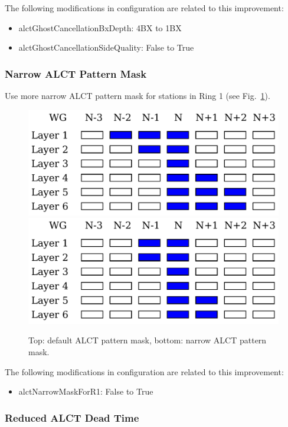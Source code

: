 The following modifications in configuration are related to this improvement:
\begin{itemize}
    \item alctGhostCancellationBxDepth: 4BX to 1BX
    \item alctGhostCancellationSideQuality: False to True
\end{itemize}

\subsubsection{Narrow ALCT Pattern Mask}

Use more narrow ALCT pattern mask for stations in Ring 1 (see Fig.~\ref{fig:narrow_alct_pattern_mask}).

\begin{figure}[tbh]
        \begin{center}
                \includegraphics[width=0.49\linewidth]{figures/alct_pretrigger.pdf}\\
                \includegraphics[width=0.49\linewidth]{figures/alct_pretrigger_r1.pdf}
                \caption{Top: default ALCT pattern mask, bottom: narrow ALCT pattern mask.}
                \label{fig:narrow_alct_pattern_mask}
        \end{center}
\end{figure}

The following modifications in configuration are related to this improvement:
\begin{itemize}
    \item alctNarrowMaskForR1: False to True
\end{itemize}

\subsubsection{Reduced ALCT Dead Time}

